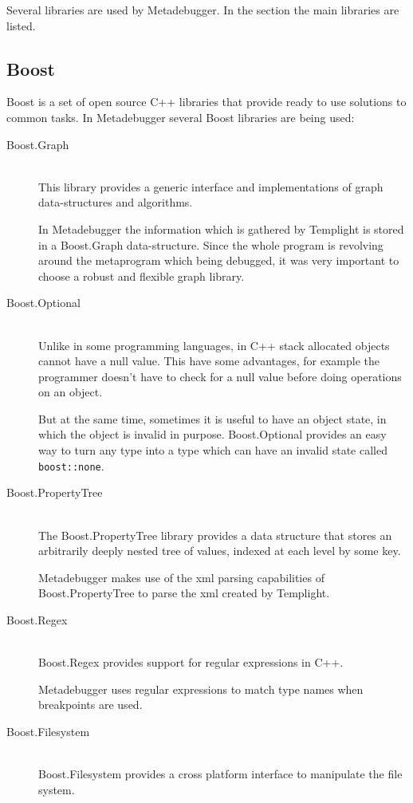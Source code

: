 Several libraries are used by Metadebugger. In the section the main libraries
are listed.

\subsection{Boost}

Boost\cite{boost} is a set of open source C++ libraries that provide ready to
use solutions to common tasks. In Metadebugger several Boost libraries are
being used:
\begin{description}
    \item[Boost.Graph]\cite{boost-graph} \hfill \\
        This library provides a generic interface and implementations of graph
        data-structures and algorithms.

        In Metadebugger the information which is gathered by Templight is
        stored in a Boost.Graph data-structure. Since the whole program is
        revolving around the metaprogram which being debugged, it was very
        important to choose a robust and flexible graph library.
    \item[Boost.Optional]\cite{boost-optional} \hfill \\
        Unlike in some programming languages, in C++ stack allocated objects
        cannot have a null value. This have some advantages, for example the
        programmer doesn't have to check for a null value before doing
        operations on an object.

        But at the same time, sometimes it is useful to have an object state,
        in which the object is invalid in purpose. Boost.Optional provides an
        easy way to turn any type into a type which can have an invalid state
        called \texttt{boost::none}.
    \item[Boost.PropertyTree]\cite{boost-pt} \hfill \\
        The Boost.PropertyTree library provides a data structure that stores an
        arbitrarily deeply nested tree of values, indexed at each level by some
        key.

        Metadebugger makes use of the xml parsing capabilities of
        Boost.PropertyTree to parse the xml created by Templight.
    \item[Boost.Regex]\cite{boost-regex} \hfill \\
        Boost.Regex provides support for regular expressions in C++.

        Metadebugger uses regular expressions to match type names when
        breakpoints are used.
    \item[Boost.Filesystem]\cite{boost-fs} \hfill \\
        Boost.Filesystem provides a cross platform interface to manipulate the
        file system.


\end{description}
